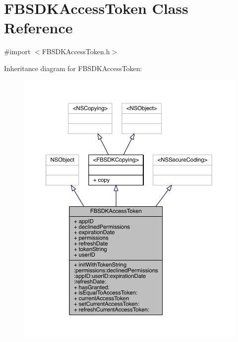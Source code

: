 \hypertarget{interface_f_b_s_d_k_access_token}{\section{F\-B\-S\-D\-K\-Access\-Token Class Reference}
\label{interface_f_b_s_d_k_access_token}
}


{\ttfamily \#import $<$F\-B\-S\-D\-K\-Access\-Token.\-h$>$}



Inheritance diagram for F\-B\-S\-D\-K\-Access\-Token\-:
\nopagebreak
\begin{figure}[H]
\begin{center}
\leavevmode
\includegraphics[width=350pt]{interface_f_b_s_d_k_access_token__inherit__graph}
\end{center}
\end{figure}


